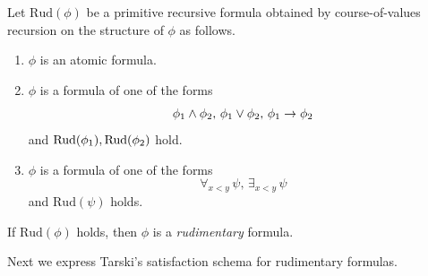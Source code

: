 \documentclass[10pt]{amsart}
\begin{document}
\begin{definition}
  Let $\mathrm{Rud}(\phi)$ be a primitive recursive formula obtained by course-of-values recursion on the structure of $\phi$ as follows.
  \begin{enumerate}[label=\textbf{(\arabic*)}, leftmargin=3.0em]
    \item $\phi$ is an atomic formula.
    \item $\phi$ is a formula of one of the forms
      $$\phi_{\rm{1}} \wedge \phi_{\rm{2}},\,\phi_{\rm{1}} \vee \phi_{\rm{2}},\,\phi_{\rm{1}} \rightarrow \phi_{\rm{2}}$$
      and $\mathrm{Rud}(\phi_{\rm{1}}),\mathrm{Rud}(\phi_{\rm{2}})$ hold.
    \item $\phi$ is a formula of one of the forms 
      $$\forall_{x < y}\,\psi,\,\exists_{x < y}\,\psi$$
      and $\mathrm{Rud}(\psi)$ holds.
  \end{enumerate}
  If $\mathrm{Rud}(\phi)$ holds, then $\phi$ is a \textit{rudimentary} formula.
\end{definition}
\noindent
Next we express Tarski's satisfaction schema for rudimentary formulas.
\end{document}
